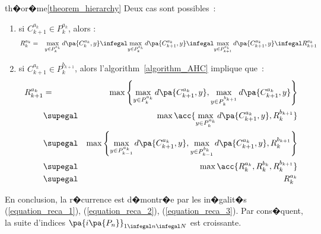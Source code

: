 \begin{xdemo}{th�or�me}{\ref{theorem_hierarchy}}
Deux cas sont possibles~:

\begin{enumerate}
\item si $C_{k+1}^{a_k} \in P_{k}^{a_{k}}$, alors :
    \begin{eqnarray}
    R_k^{a_k}   &=&         \underset{y \in P_{k}^{a_{k}}}{\max} \, d\pa{C_{k}^{a_k},y} %
                \infegal  \underset{y \in P_{k}^{a_{k}}}{\max} \, d\pa{C_{k+1}^{a_k},y} 
                \infegal  \underset{y \in P_{k+1}^{a_{k}}}{\max} \, d\pa{C_{k+1}^{a_k},y} %
                \infegal  R_{k+1}^{a_k} \label{equation_reca_2}
    \end{eqnarray}
\item si $C_{k+1}^{a_k} \in P_{k}^{b_{k+1}}$, alors l'algorithm~\ref{algorithm_AHC} implique que~:
    \begin{eqnarray}
    R_{k+1}^{a_k}   &=&         \max \Bigg\{  
                                                            \underset{y \in P_{k}^{a_{k}}}{\max} \, d\pa{C_{k+1}^{a_k},y} , %
                                \underset{y \in P_{k}^{b_{k+1}}}{\max} \, d\pa{C_{k+1}^{a_k},y} 
                                \Bigg \}\nonumber\\
                    &\supegal&  \max \acc{  \underset{y \in P_{k}^{a_{k}}}{\max} \, 
                                                                d\pa{C_{k+1}^{a_k},y} , R_k^{b_{k+1}} }\nonumber\\
                    &\supegal&  \max \Bigg\{  \underset{y \in P_{k-1}^{a_{k}}}{\max} \, 
                                                                d\pa{C_{k+1}^{a_k},y} , 
                                            \underset{y \in P_{k-1}^{b_{k}}}{\max} \, d\pa{C_{k+1}^{a_k},y} ,
                                            R_k^{b_{k+1}} \Bigg\}\nonumber\\
                    &\supegal&  \max \acc{  R_k^{a_{k}}  , R_k^{b_{k}} , R_k^{b_{k+1}} }\nonumber\\
                    &\supegal&  R_k^{a_{k}}  \label{equation_reca_3}
    \end{eqnarray}
\end{enumerate}


En conclusion, la r�currence est d�montr�e par les in�galit�s (\ref{equation_reca_1}), (\ref{equation_reca_2}),
(\ref{equation_reca_3}). Par cons�quent, la suite d'indices $\pa{i\pa{P_n}}_{1 \infegal n \infegal N}$ est croissante.


\end{xdemo}






